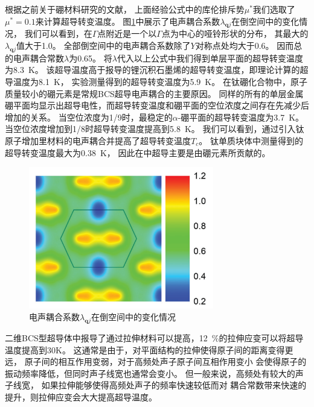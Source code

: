 根据之前关于硼材料研究的文献\cite{penev2016can,zhao2016superconductivity,zhao2018multigap,liao2017phonon,yan2020superconductivity}，
上面经验公式中的库伦排斥势$\mu^*$我们选取了$\mu^*=0.1$来计算超导转变温度。
图\ref{fig:ch5_tib7_coupling}中展示了电声耦合系数$\lambda_{\bm{q}j}$在倒空间中的变化情况，
我们可以看到，在$\Gamma$点附近是一个以$\Gamma$点为中心的哑铃形状的分布，
其最大的$\lambda_{\bm{q}j}$值大于\num{1.0}。
全部倒空间中的电声耦合系数除了$Y$对称点处均大于\num{0.6}。
因而总的电声耦合常数$\lambda$为\num{0.65}。
将$\lambda$代入以上公式中我们得到单层平面的超导转变温度为\SI{8.3}{\kelvin}。
该超导温度高于报导的锂沉积石墨烯的超导转变温度，即理论计算的超导温度为\SI{8.1}{\kelvin}\cite{profeta2012phonon}，
实验测量得到的超导转变温度为\SI{5.9}{\kelvin}\cite{ludbrook2015evidence}。
在钛硼化合物中，原子质量较小的硼元素是常规BCS超导电声耦合的主要原因。
同样的所有的单层金属硼平面均显示出超导电性，而超导转变温度和硼平面的空位浓度之间存在先减少后增加的关系。
当空位浓度为\num{1/9}时，最稳定的$\alpha$-硼平面的超导转变温度为\SI{3.7}{\kelvin}。
当空位浓度增加到\num{1/8}时超导转变温度提高到\SI{5.8}{\kelvin}。
我们可以看到，通过引入钛原子增加里材料的电声耦合并提高了超导转变温度$T_c$。
钛单质块体中测量得到的超导转变温度最大为\SI{0.38}{\kelvin}\cite{matthias1963superconductivity}，
因此在中超导主要是由硼元素所贡献的。

\begin{figure}
  \includegraphics[width=0.72\textwidth]{figs/ch5_tib7_coupling.png}
  \centering
  \caption{电声耦合系数$\lambda_{\bm{q}j}$在倒空间中的变化情况}
  \label{fig:ch5_tib7_coupling}
\end{figure}

二维BCS型超导体中报导了通过拉伸材料可以提高，\SI{12}{\percent}的拉伸应变可以将超导温度提高到30K。
这通常是由于，对平面结构的拉伸使得原子间的距离变得更远，
原子间的相互作用变弱，对于高频处声子原子间互相作用变小
会使得原子的振动频率降低，但同时声子线宽也通常会变小。
但一般来说，高频处有较大的声子线宽，
如果拉伸能够使得高频处声子的频率快速较低而对
耦合常数带来快速的提升，则拉伸应变会大大提高超导温度。

